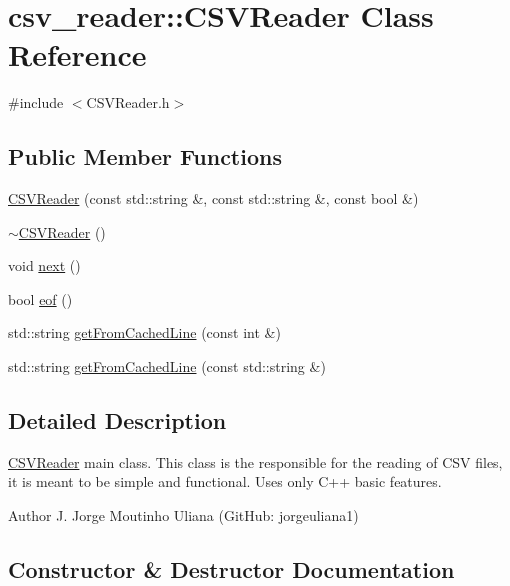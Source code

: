 \hypertarget{classcsv__reader_1_1CSVReader}{}\section{csv\+\_\+reader\+:\+:C\+S\+V\+Reader Class Reference}
\label{classcsv__reader_1_1CSVReader}


{\ttfamily \#include $<$C\+S\+V\+Reader.\+h$>$}

\subsection*{Public Member Functions}
\begin{DoxyCompactItemize}
\item 
\hyperlink{classcsv__reader_1_1CSVReader_a1c9e44a97262f1babaa795bdd92dc81e}{C\+S\+V\+Reader} (const std\+::string \&, const std\+::string \&, const bool \&)
\item 
\hyperlink{classcsv__reader_1_1CSVReader_a2bab9d6e9e1a42389dcc60c5e24e0559}{$\sim$\+C\+S\+V\+Reader} ()
\item 
void \hyperlink{classcsv__reader_1_1CSVReader_a935f052bb21d30a21271c14adf1c2cdf}{next} ()
\item 
bool \hyperlink{classcsv__reader_1_1CSVReader_aaa896b34e603f82f5999fdb46a5e3450}{eof} ()
\item 
std\+::string \hyperlink{classcsv__reader_1_1CSVReader_a9f589ea936d84a8c7f774ceb8d93d9a2}{get\+From\+Cached\+Line} (const int \&)
\item 
std\+::string \hyperlink{classcsv__reader_1_1CSVReader_a3be8bcb33ec67ae9edeb711f534d840d}{get\+From\+Cached\+Line} (const std\+::string \&)
\end{DoxyCompactItemize}


\subsection{Detailed Description}
\hyperlink{classcsv__reader_1_1CSVReader}{C\+S\+V\+Reader} main class. This class is the responsible for the reading of C\+SV files, it is meant to be simple and functional. Uses only C++ basic features. \begin{DoxyAuthor}{Author}
J. Jorge Moutinho Uliana (Git\+Hub\+: jorgeuliana1) 
\end{DoxyAuthor}


\subsection{Constructor \& Destructor Documentation}
\mbox{\label{classcsv__reader_1_1CSVReader_a1c9e44a97262f1babaa795bdd92dc81e}} 
